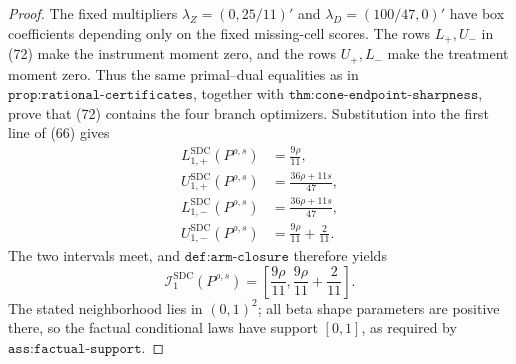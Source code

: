 \documentclass{article}
\begin{document}
\begin{proof}
The fixed multipliers \(\lambda_Z=(0,25/11)'\) and \(\lambda_D=(100/47,0)'\) have box coefficients depending only on the fixed missing-cell scores.  The rows \(L_+,U_-\) in (72) make the instrument moment zero, and the rows \(U_+,L_-\) make the treatment moment zero.  Thus the same primal--dual equalities as in \(\texttt{prop:rational-certificates}\), together with \(\texttt{thm:cone-endpoint-sharpness}\), prove that (72) contains the four branch optimizers.  Substitution into the first line of (66) gives
\[
 \begin{aligned}
 L_{1,+}^{\mathrm{SDC}}(P^{\rho,s})&=\frac{9\rho}{11},\\
 U_{1,+}^{\mathrm{SDC}}(P^{\rho,s})&=\frac{36\rho+11s}{47},\\
 L_{1,-}^{\mathrm{SDC}}(P^{\rho,s})&=\frac{36\rho+11s}{47},\\
 U_{1,-}^{\mathrm{SDC}}(P^{\rho,s})&=\frac{9\rho}{11}+\frac2{11}.
 \end{aligned}                                                               \tag{77}
\]
The two intervals meet, and \(\texttt{def:arm-closure}\) therefore yields
\[
 \mathcal I_1^{\mathrm{SDC}}(P^{\rho,s})
 =\left[\frac{9\rho}{11},\frac{9\rho}{11}+\frac2{11}\right].              \tag{78}
\]
The stated neighborhood lies in \((0,1)^2\); all beta shape parameters are positive there, so the factual conditional laws have support \([0,1]\), as required by \(\texttt{ass:factual-support}\).


\end{proof}
\end{document}
